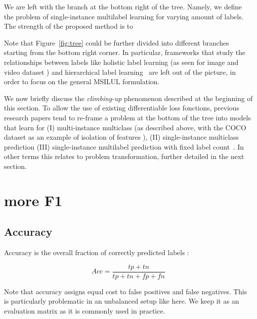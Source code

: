 We are left with the branch at the bottom right of the tree. Namely, we define the problem of single-instance multilabel learning for varying amount of labels. The strength of the proposed method is to 

Note that Figure~\ref{fig:tree} could be further divided into different branches starting from the bottom right corner. In particular, frameworks that study the relationships between labels like holistic label learning (as seen for image \cite{holisticImageDescriptors,holisticLungs} and video dataset \cite{holisticVideoData} ) and hierarchical label learning~\cite{activeLearningMultiLabel, HARAM} are left out of the picture, in order to focus on the general MSILUL formulation. 

We now briefly discuss the \emph{climbing-up} phenomenon described at the beginning of this section. To allow the use of existing differentiable loss fonctions, previous research papers tend to re-frame a problem at the bottom of the tree into models that learn for (I) multi-instance multiclass (as described above, with the COCO dataset as an example of isolation of features \cite{COCO}), (II) single-instance multiclass prediction \cite{multiclass} (III) single-instance multilabel prediction with fixed label count~\cite{threshForF1}. In other terms this relates to problem transformation, further detailed in the next section.


\section{more F1}

\subsection{Accuracy}

Accuracy is the overall fraction of correctly predicted labels \cite{threshForF1}:

$$
A c c=\frac{\mathit{tp} + \mathit{tn}}{\mathit{tp} + \mathit{tn} + \mathit{fp} + \mathit{fn}}
$$

Note that accuracy assigns equal cost to false positives and false negatives. This is particularly problematic in an unbalanced setup like here. We keep it as an evaluation matrix as it is commonly used in practice.

